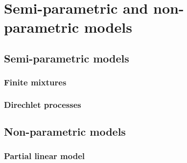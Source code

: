 \chapter{Semi-parametric and non-parametric models}\label{chap11}

\section{Semi-parametric models}\label{sec11_1}
\subsection{Finite mixtures}\label{sec11_11}

\subsection{Direchlet processes}\label{sec11_12}

\section{Non-parametric models}\label{sec11_2}
\subsection{Partial linear model}\label{sec11_21}

